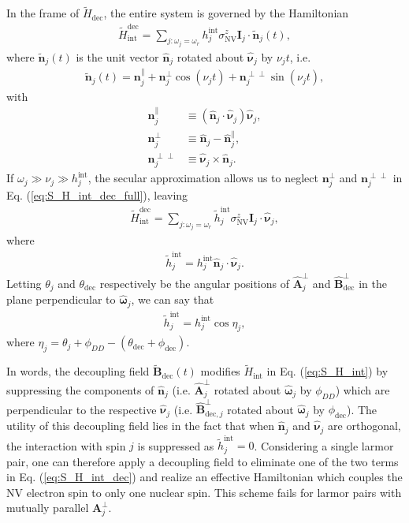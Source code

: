 \documentclass[twocolumn]{revtex4-1}
\renewcommand{\t}{\text} %
\newcommand{\p}[1]{\left(#1\right)} %
\renewcommand{\v}{\bm} %
\newcommand{\uv}[1]{\hat{\v{#1}}} %
\renewcommand{\c}{\cdot} %
\newcommand{\NV}{\t{NV}}
\begin{document}
In the frame of $\tilde H_{\t{dec}}$, the entire system is governed by
the Hamiltonian
\begin{align}
  \tilde H_{\t{int}}^{\t{dec}} = \sum_{j:\omega_j=\omega_r}
  h_j^{\t{int}}\sigma_\NV^z\v I_j\c\tilde{\v n}_j\p{t},
  \label{eq:S_H_int_dec_full}
\end{align}
where $\tilde{\v n}_j\p{t}$ is the unit vector $\uv n_j$ rotated about
$\uv\nu_j$ by $\nu_jt$, i.e.
\begin{align}
  \tilde{\v n}_j\p{t} = \v n_j^\parallel +
  \v n_j^\perp\cos\p{\nu_jt} + \v n_j^{\perp\perp}\sin\p{\nu_jt},
\end{align}
with
\begin{align}
  \v n_j^\parallel &\equiv \p{\uv n_j\c\uv\nu_j}\uv\nu_j, \\
  \v n_j^\perp &\equiv \uv n_j - \uv n_j^\parallel, \\
  \v n_j^{\perp\perp} &\equiv \uv\nu_j\times\uv n_j.
\end{align}
If $\omega_j\gg\nu_j\gg h_j^{\t{int}}$, the secular approximation
allows us to neglect $\v n_j^\perp$ and $\v n_j^{\perp\perp}$ in
Eq. (\ref{eq:S_H_int_dec_full}), leaving
\begin{align}
  \tilde H_{\t{int}}^{\t{dec}}
  = \sum_{j:\omega_j=\omega_r}
  \tilde h_j^{\t{int}}\sigma_\NV^z\v I_j\c\uv\nu_j,
  \label{eq:S_H_int_dec}
\end{align}
where
\begin{align}
  \tilde h_j^{\t{int}}
  = h_j^{\t{int}}\uv n_j\c\uv\nu_j.
\end{align}
Letting $\theta_j$ and $\theta_{\t{dec}}$ respectively be the angular
positions of $\uv A_j^\perp$ and $\uv B_{\t{dec}}^\perp$ in the plane
perpendicular to $\uv\omega_j$, we can say that
\begin{align}
  \tilde h_j^{\t{int}} = h_j^{\t{int}}\cos\eta_j,
\end{align}
where $\eta_j=\theta_j+\phi_{DD}-\p{\theta_{\t{dec}}+\phi_{\t{dec}}}$.

In words, the decoupling field $\tilde{\v B}_{\t{dec}}\p{t}$ modifies
$\tilde H_{\t{int}}$ in Eq. (\ref{eq:S_H_int}) by suppressing the
components of $\uv n_j$ (i.e. $\uv A_j^\perp$ rotated about
$\uv\omega_j$ by $\phi_{DD}$) which are perpendicular to the
respective $\uv\nu_j$ (i.e.  $\uv B_{\t{dec},j}^\perp$ rotated about
$\uv\omega_j$ by $\phi_{\t{dec}}$). The utility of this decoupling
field lies in the fact that when $\uv n_j$ and $\uv\nu_j$ are
orthogonal, the interaction with spin $j$ is suppressed as
$\tilde h_j^{\t{int}}=0$. Considering a single larmor pair, one can
therefore apply a decoupling field to eliminate one of the two terms
in Eq. (\ref{eq:S_H_int_dec}) and realize an effective Hamiltonian
which couples the NV electron spin to only one nuclear spin. This
scheme fails for larmor pairs with mutually parallel $\v A_j^\perp$.
\end{document}
